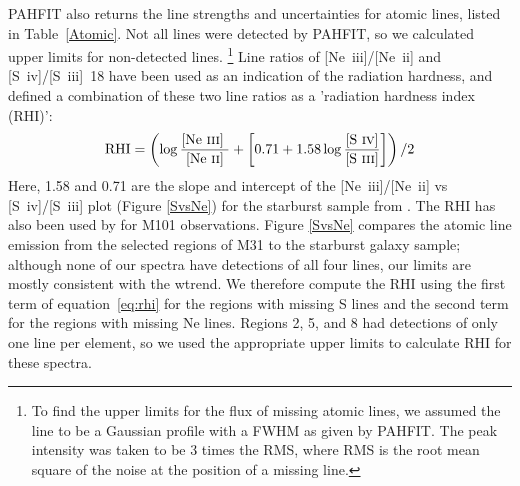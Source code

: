 \documentclass[useAMS,usenatbib,a4paper]{mn2e}
\begin{document}
PAHFIT also returns the line strengths and uncertainties for atomic lines, listed in Table~\ref{Atomic}.
Not all lines were detected by PAHFIT, so we calculated upper limits for non-detected lines.%
\footnote{To find  the upper limits for the flux of missing atomic lines, we assumed the line to be a 
Gaussian profile with a FWHM as given by PAHFIT. The peak intensity was taken to be 3 times the RMS, where RMS is the root mean square of 
the noise at the position of a missing line.}
Line ratios of [Ne~{\sc iii}]/[Ne~{\sc ii}] and [S~{\sc iv}]/[S~{\sc iii}]~18 have been used as an indication of the radiation hardness, and
\citet{Engelbracht_2008} defined a combination of these two line ratios as a 'radiation hardness index (RHI)':
\begin{equation}
{\rm RHI} = \left( \log\frac{\textrm{[Ne~{\sc iii}] }}{\textrm{[Ne~{\sc ii}]}} + \left[0.71 + 1.58\log\frac{\textrm{{[S~{\sc iv}]}}}{\textrm{{[S~{\sc iii}]}}}\right]\right) /2
\end{equation}
\label{eq:rhi}
Here, 1.58 and 0.71 are the slope and intercept of the [Ne~{\sc iii}]/[Ne~{\sc ii}]  vs [S~{\sc iv}]/[S~{\sc iii}] plot (Figure \ref{SvsNe}) for the starburst sample from 
\citet{Engelbracht_2008}. The RHI has also been used by \citet{Gordon:2008lr} for M101 observations. 
Figure \ref{SvsNe}  compares the atomic line emission from the selected regions of M31 to the starburst galaxy sample;
although none of our spectra have detections of all four lines, our limits are mostly consistent with the wtrend.
We therefore compute the RHI using the first term of equation~\ref{eq:rhi} for the regions with missing S lines
and the second term for the regions with missing Ne lines.
Regions 2, 5, and 8 had detections of only one line per element, so we used the appropriate upper limits 
to calculate RHI for these spectra.
\end{document}
